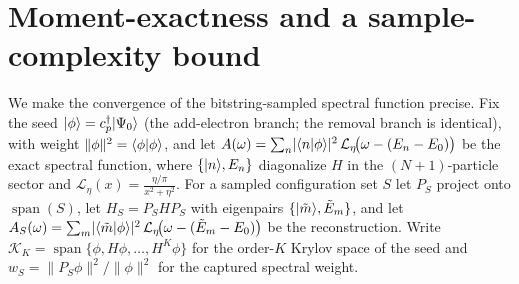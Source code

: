 \section{Moment-exactness and a sample-complexity bound}
\label{app:b2}

We make the convergence of the bitstring-sampled spectral function precise. Fix the seed
$\lvert \phi \rangle=c^{\dagger}_{p}\lvert \Psi_0 \rangle$ (the add-electron branch; the removal branch is identical),
with weight $\lVert\phi\rVert^{2}=\langle \phi|\phi \rangle$, and let
$A(\omega)=\sum_{n}\lvert\langle n|\phi \rangle\rvert^{2}\,\mathcal{L}_{\eta}\!\big(\omega-(E_n-E_0)\big)$
be the exact spectral function, where $\{\lvert n \rangle,E_n\}$ diagonalize $H$ in the $(N\!+\!1)$-particle
sector and $\mathcal{L}_{\eta}(x)=\tfrac{\eta/\pi}{x^{2}+\eta^{2}}$. For a sampled configuration set
$S$ let $P_S$ project onto $\operatorname{span}(S)$, let $H_S=P_SHP_S$ with eigenpairs
$\{\lvert \tilde m \rangle,\tilde E_m\}$, and let
$A_S(\omega)=\sum_{m}\lvert\langle \tilde m|\phi \rangle\rvert^{2}\,\mathcal{L}_{\eta}\!\big(\omega-(\tilde E_m-E_0)\big)$
be the reconstruction. Write $\mathcal{K}_K=\operatorname{span}\{\phi,H\phi,\dots,H^{K}\phi\}$ for the
order-$K$ Krylov space of the seed and $w_S=\lVert P_S\phi\rVert^{2}/\lVert\phi\rVert^{2}$ for the
captured spectral weight.

